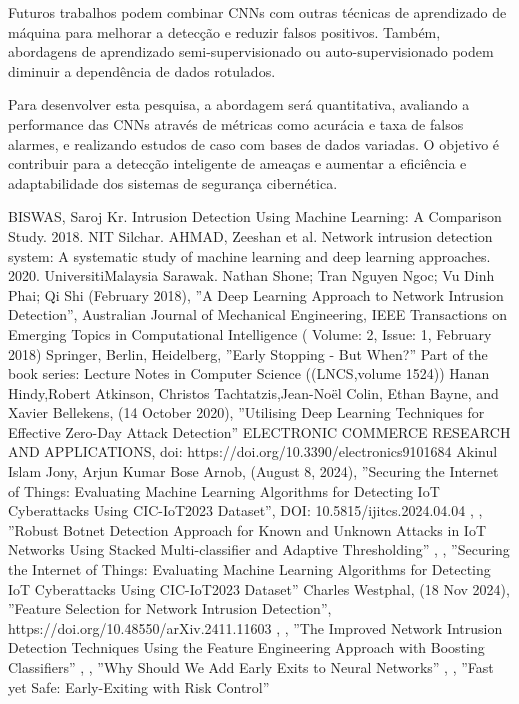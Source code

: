 \documentclass[conference]{IEEEtran}
\begin{document}
    Futuros trabalhos podem combinar CNNs com outras técnicas de aprendizado de máquina para melhorar a detecção e reduzir falsos positivos. Também, abordagens de aprendizado semi-supervisionado ou auto-supervisionado podem diminuir a dependência de dados rotulados.
    
    Para desenvolver esta pesquisa, a abordagem será quantitativa, avaliando a performance das CNNs através de métricas como acurácia e taxa de falsos alarmes, e realizando estudos de caso com bases de dados variadas. O objetivo é contribuir para a detecção inteligente de ameaças e aumentar a eficiência e adaptabilidade dos sistemas de segurança cibernética.
    
\begin{thebibliography}{00}

BISWAS, Saroj Kr. Intrusion Detection Using Machine Learning: A Comparison Study. 2018. NIT Silchar.
AHMAD, Zeeshan et al. Network intrusion detection system: A systematic study of machine learning and deep learning approaches. 2020. UniversitiMalaysia Sarawak.
 Nathan Shone; Tran Nguyen Ngoc; Vu Dinh Phai; Qi Shi  (February 2018), ''A Deep Learning Approach to Network Intrusion Detection'', Australian Journal of Mechanical Engineering, IEEE Transactions on Emerging Topics in Computational Intelligence ( Volume: 2, Issue: 1, February 2018)
 Springer, Berlin, Heidelberg, ''Early Stopping - But When?'' Part of the book series: Lecture Notes in Computer Science ((LNCS,volume 1524))
 Hanan Hindy,Robert Atkinson, Christos Tachtatzis,Jean-Noël Colin, Ethan Bayne, and Xavier Bellekens, (14 October 2020), ''Utilising Deep Learning Techniques for Effective Zero-Day Attack Detection'' ELECTRONIC COMMERCE RESEARCH AND APPLICATIONS, doi: https://doi.org/10.3390/electronics9101684
 Akinul Islam Jony, Arjun Kumar Bose Arnob, (August 8, 2024), ''Securing the Internet of Things: Evaluating Machine Learning Algorithms for Detecting IoT Cyberattacks Using CIC-IoT2023 Dataset'', DOI: 10.5815/ijitcs.2024.04.04
 , , ''Robust Botnet Detection Approach for Known and Unknown Attacks in IoT Networks Using Stacked Multi-classifier and Adaptive Thresholding''
 , , ''Securing the Internet of Things: Evaluating Machine Learning Algorithms for Detecting IoT Cyberattacks Using CIC-IoT2023 Dataset''
 Charles Westphal, (18 Nov 2024), ''Feature Selection for Network Intrusion Detection'', https://doi.org/10.48550/arXiv.2411.11603
 , , ''The Improved Network Intrusion Detection Techniques Using the Feature Engineering Approach with Boosting Classifiers''
 , , ''Why Should We Add Early Exits to Neural Networks''
 , , ''Fast yet Safe: Early-Exiting with Risk Control''

\end{thebibliography}
\end{document}
